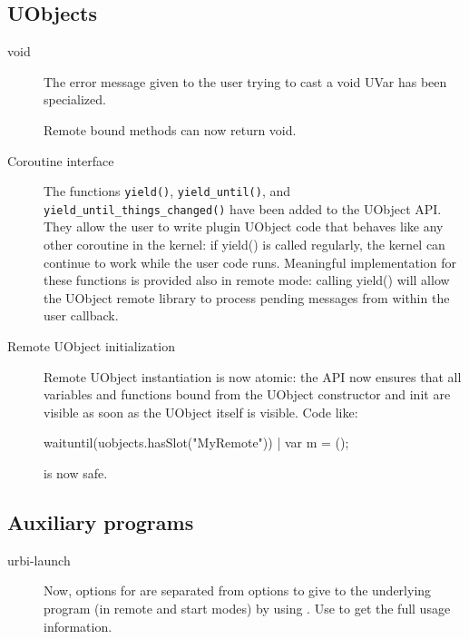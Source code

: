 \subsection{UObjects}

\begin{description}
\item[void]
The error message given to the user trying to cast a void UVar has been
specialized.

Remote bound methods can now return void.


\item[Coroutine interface]

  The functions \lstinline|yield()|, \lstinline|yield_until()|, and
  \lstinline|yield_until_things_changed()| have been added to the
  UObject API. They allow the user to write plugin UObject code that
  behaves like any other coroutine in the kernel: if yield() is called
  regularly, the kernel can continue to work while the user code runs.
  Meaningful implementation for these functions is provided also in
  remote mode: calling yield() will allow the UObject remote library
  to process pending messages from within the user callback.

\item[Remote UObject initialization]

  Remote UObject instantiation is now atomic: the API now ensures that
  all variables and functions bound from the UObject constructor and
  init are visible as soon as the UObject itself is visible. Code
  like:

\begin{urbiunchecked}
waituntil(uobjects.hasSlot("MyRemote")) | var m = ();
\end{urbiunchecked}

\noindent
is now safe.
\end{description}

\subsection{Auxiliary programs}

\begin{description}
\item[urbi-launch] Now, options for  are separated from
  options to give to the underlying program (in remote and start modes) by
  using \option{--}. Use  to get the full usage
  information.
\end{description}



